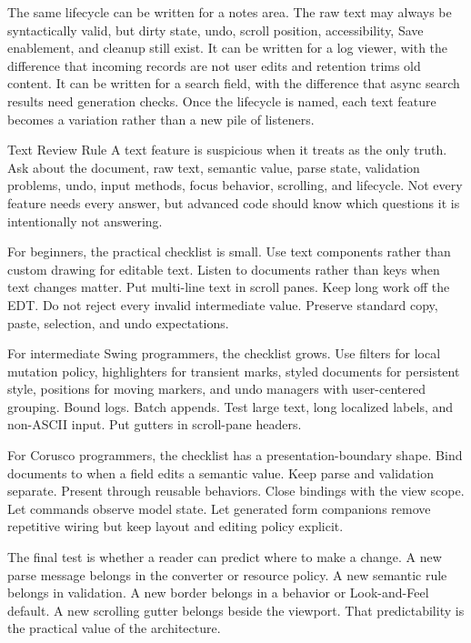 The same lifecycle can be written for a notes area. The raw text may always be
syntactically valid, but dirty state, undo, scroll position, accessibility,
Save enablement, and cleanup still exist. It can be written for a log viewer,
with the difference that incoming records are not user edits and retention
trims old content. It can be written for a search field, with the difference
that async search results need generation checks. Once the lifecycle is named,
each text feature becomes a variation rather than a new pile of listeners.

\begin{detailbox}{Text Review Rule}
A text feature is suspicious when it treats  as the only truth. Ask about the document, raw text, semantic value, parse state, validation problems, undo, input methods, focus behavior, scrolling, and lifecycle. Not every feature needs every answer, but advanced code should know which questions it is intentionally not answering.
\end{detailbox}

For beginners, the practical checklist is small. Use text components rather than custom drawing for editable text. Listen to documents rather than keys when text changes matter. Put multi-line text in scroll panes. Keep long work off the EDT. Do not reject every invalid intermediate value. Preserve standard copy, paste, selection, and undo expectations.

For intermediate Swing programmers, the checklist grows. Use filters for local mutation policy, highlighters for transient marks, styled documents for persistent style, positions for moving markers, and undo managers with user-centered grouping. Bound logs. Batch appends. Test large text, long localized labels, and non-ASCII input. Put gutters in scroll-pane headers.

For Corusco programmers, the checklist has a presentation-boundary shape. Bind documents to  when a field edits a semantic value. Keep parse and validation separate. Present  through reusable behaviors. Close bindings with the view scope. Let commands observe model state. Let generated form companions remove repetitive wiring but keep layout and editing policy explicit.

The final test is whether a reader can predict where to make a change. A new parse message belongs in the converter or resource policy. A new semantic rule belongs in validation. A new border belongs in a behavior or Look-and-Feel default. A new scrolling gutter belongs beside the viewport. That predictability is the practical value of the architecture.

